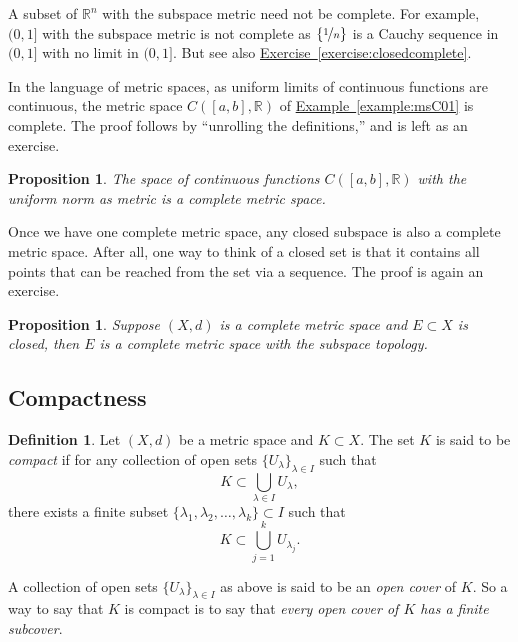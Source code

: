 \documentclass[12pt,openany]{book}
\newcommand{\R}{{\mathbb{R}}}
\newcommand{\myindex}[1]{#1\index{#1}}
\theoremstyle{plain}
\newtheorem{prop}[thm]{Proposition}
\theoremstyle{remark}
\theoremstyle{definition}
\newtheorem{defn}[thm]{Definition}
\theoremstyle{exercise}
\theoremstyle{example}
\newcommand{\exerciseref}[1]{\hyperref[#1]{Exercise~\ref*{#1}}}
\newcommand{\exampleref}[1]{\hyperref[#1]{Example~\ref*{#1}}}
\begin{document}
A subset of $\R^n$ with the subspace metric need not be
complete.  For example, $(0,1]$ with the subspace metric is not
complete as $\{ \nicefrac{1}{n} \}$ is a Cauchy sequence in $(0,1]$
with no limit in $(0,1]$.  But see also
\exerciseref{exercise:closedcomplete}.

In the language of metric spaces,
as uniform limits of continuous functions are continuous,
the metric space
$C([a,b],\R)$ of \exampleref{example:msC01} is complete.
The proof follows by ``unrolling the definitions,'' 
and is left as an exercise.

\begin{prop} \label{prop:CabRcomplete}
The space of continuous functions $C([a,b],\R)$ with the uniform
norm as metric is a complete metric space.
\end{prop}

Once we have one complete metric space, any closed subspace is
also a complete metric space.  After all, one way
to think of a closed set is that it contains all points
that can be reached from the set via a sequence.
The proof is again an exercise.

\begin{prop} \label{prop:closedcomplete}
Suppose $(X,d)$ is a complete metric space and $E \subset X$
is closed, then $E$ is a complete metric space with the subspace topology.
\end{prop}

\subsection{Compactness}

\begin{defn}
Let $(X,d)$ be a metric space and $K \subset X$. 
The set $K$ is said to be \emph{\myindex{compact}}
if for any collection
of open sets $\{ U_{\lambda} \}_{\lambda \in I}$ such that
\begin{equation*}
K \subset \bigcup_{\lambda \in I} U_\lambda ,
\end{equation*}
there exists a finite subset
$\{ \lambda_1, \lambda_2,\ldots,\lambda_k \} \subset I$
such that
\begin{equation*}
K \subset \bigcup_{j=1}^k U_{\lambda_j} .
\end{equation*}
\end{defn}

A collection of open sets $\{ U_{\lambda} \}_{\lambda \in I}$ as above is
said to be an \emph{\myindex{open cover}} of $K$.  So a way to say that
$K$ is compact is to say that \emph{every open cover of $K$ has a finite
\myindex{subcover}}.
\end{document}
